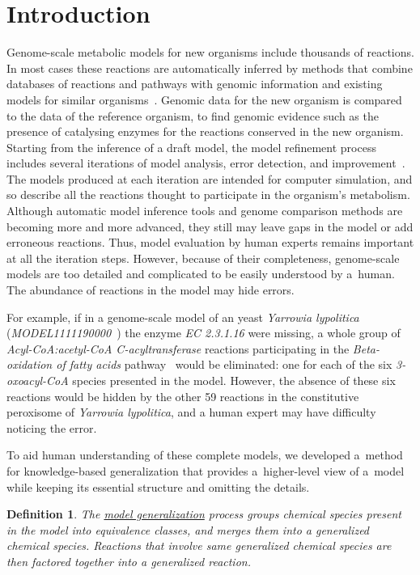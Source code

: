 \documentclass[10pt]{bmc_article}
\newenvironment{bmcformat}{\baselineskip20pt\sloppy\setboolean{publ}{false}}{\baselineskip20pt\sloppy}
\begin{document}
\begin{bmcformat}
\section*{Introduction}
Genome-scale metabolic models for new organisms include thousands of reactions. In most cases these reactions are automatically inferred by methods that combine databases of reactions and pathways with genomic information and existing models for similar organisms~\cite{Swainston}. Genomic data for the new organism is compared to the data of the reference organism, to find genomic evidence such as the presence of catalysing enzymes for the reactions conserved in the new organism. Starting from the inference of a draft model, the model refinement process includes several iterations of model analysis, error detection, and improvement~\cite{Thiele2010}. The models produced at each iteration are intended for computer simulation, and so describe all the reactions thought to participate in the organism's metabolism. Although automatic model inference tools and genome comparison methods are becoming more and more advanced, they still may leave gaps in the model or add erroneous reactions. Thus, model evaluation by human experts remains important at all the iteration steps. However, because of their completeness, genome-scale models are too detailed and complicated to be easily understood by a~human. The abundance of reactions in the model may hide errors.

For example, if in a genome-scale model of an yeast \textit{Yarrowia lypolitica} (\emph{MODEL1111190000}~\cite{Loira12}) the enzyme \textit{EC 2.3.1.16} were missing, a whole group of \textit{Acyl-CoA:acetyl-CoA C-acyltransferase} reactions participating in the \textit{Beta-oxidation of fatty acids} pathway~\cite{Metzler01} would be eliminated: one for each of the six \textit{3-oxoacyl-CoA} species presented in the model. However, the absence of these six reactions would be hidden by the other 59 reactions in the constitutive peroxisome of \textit{Yarrowia lypolitica}, and a human expert may have difficulty noticing the error.

To aid human understanding of these complete models, we developed a~method for knowledge-based generalization that provides a~higher-level view of a~model while keeping its essential structure and omitting the details. 

\newtheorem{eq00}[def]{Definition}
\begin{eq00}
The \underline{model generalization} process groups chemical species present in the model into equivalence classes, and merges them into a generalized chemical species. Reactions that involve same generalized chemical species are then factored together into a generalized reaction. 
\end{eq00}


\end{bmcformat}
\end{document}
